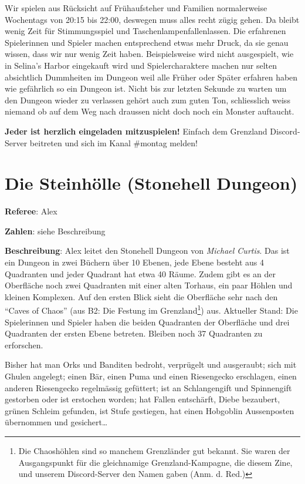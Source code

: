 \documentclass[11pt]{wbzine}
\begin{document}
\begin{multicols}{2}
Wir spielen aus Rücksicht auf Frühaufsteher und Familien normalerweise
Wochentags von 20:15 bis 22:00, deswegen muss alles recht zügig gehen. Da
bleibt wenig Zeit für Stimmungsspiel und Taschenlampenfallenlassen. Die
erfahrenen Spielerinnen und Spieler machen entsprechend etwas mehr Druck, da
sie genau wissen, dass wir nur wenig Zeit haben. Beispielsweise wird nicht
ausgespielt, wie in Selina's Harbor eingekauft wird und Spielercharaktere
machen nur selten absichtlich Dummheiten im Dungeon weil alle Früher oder
Später erfahren haben wie gefährlich so ein Dungeon ist. Nicht bis zur letzten
Sekunde zu warten um den Dungeon wieder zu verlassen gehört auch zum guten Ton,
schliesslich weiss niemand ob auf dem Weg nach draussen nicht doch noch ein
Monster auftaucht.

\textbf{Jeder ist herzlich eingeladen mitzuspielen!} Einfach dem Grenzland
Discord-Server beitreten und sich im Kanal \#montag melden!


\section{Die Steinhölle (Stonehell Dungeon)}

\textbf{Referee}: Alex

\textbf{Zahlen}: siehe Beschreibung

    \textbf{Beschreibung}: Alex leitet den Stonehell Dungeon von
    \textit{Michael Curtis}. Das ist ein Dungeon in zwei Büchern
    über 10 Ebenen, jede Ebene besteht aus 4 Quadranten und jeder
    Quadrant hat etwa 40 Räume. Zudem gibt es an der Oberfläche noch
    zwei Quadranten mit einer alten Torhaus, ein paar Höhlen und
    kleinen Komplexen. Auf den ersten Blick sieht die Oberfläche
    sehr nach den “Caves of Chaos” (aus B2: Die Festung im
    Grenzland\footnote{Die Chaoshöhlen sind so manchem Grenzländer
    gut bekannt. Sie waren der Ausgangspunkt für die gleichnamige
    Grenzland-Kampagne, die diesem Zine, und unserem Discord-Server
    den Namen gaben (Anm. d. Red.)}) aus. Aktueller Stand: Die
    Spielerinnen und Spieler haben die beiden Quadranten der
    Oberfläche und drei Quadranten der ersten Ebene betreten.
    Bleiben noch 37 Quadranten zu erforschen.

    Bisher hat man Orks und Banditen bedroht, verprügelt und
    ausgeraubt; sich mit Ghulen angelegt; einen Bär, einen Puma und
    einen Riesengecko erschlagen, einen anderen Riesengecko
    regelmässig gefüttert; ist an Schlangengift und Spinnengift
    gestorben oder ist erstochen worden; hat Fallen entschärft,
    Diebe bezaubert, grünen Schleim gefunden, ist Stufe gestiegen,
    hat einen Hobgoblin Aussenposten übernommen und gesichert…


\end{multicols}
\end{document}
